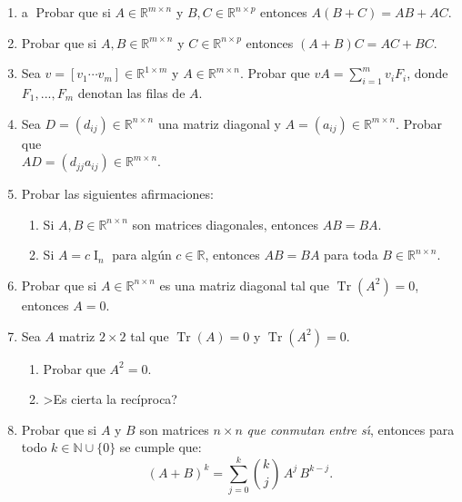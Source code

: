 \begin{enumerate}[resume, topsep=6pt, itemsep=.4cm]


\item\label{ej: distributiva} \textcircled{a} Probar que si $A\in\mathbb{R}^{m\times n}$ y $B,C\in\mathbb{R}^{n\times p}$ entonces
$A(B+ C)=AB + AC$.

\item Probar que si $A,B\in\mathbb{R}^{m\times n}$ y $C\in\mathbb{R}^{n\times p}$ entonces
$(A+B)C = AC + BC$.

\item Sea $v=[v_1 \cdots v_m]\in\mathbb{R}^{1\times m}$ y $A\in\mathbb{R}^{m\times n}$. Probar que $vA=\sum_{i=1}^m v_iF_i$, donde $F_1, ..., F_m$ denotan las filas de $A$.

\item Sea $D=(d_{ij})\in\mathbb{R}^{n\times n}$ una matriz diagonal y $A=(a_{ij})\in\mathbb{R}^{m\times n}$. Probar que \\ $AD=(d_{jj}a_{ij})\in\mathbb{R}^{m\times n}$.

\item
Probar las siguientes afirmaciones:
\begin{enumerate}[topsep=5pt,itemsep=5pt]
\item Si $A,B\in\mathbb{R}^{n\times n}$ son matrices diagonales, entonces $AB=BA$.
\item Si $A=c \operatorname{I}_n$ para algún $c \in \mathbb{R}$, entonces $AB=BA$ para toda $B\in\mathbb{R}^{n\times n}$.
\end{enumerate}

\item Probar que si $A\in\mathbb{R}^{n\times n}$ es una matriz diagonal tal que $\operatorname{Tr} (A^2)=0$, entonces $A=0$.

\item Sea $A$ matriz $2\times 2$  tal que $\operatorname{Tr}(A)=0$ y $\operatorname{Tr}(A^2)=0$.

\begin{enumerate}[topsep=5pt,itemsep=5pt]
    \item  Probar que $A^2 = 0$.
    \item   >Es cierta la recíproca?
\end{enumerate}


\item Probar que si $A$ y $B$ son matrices $n \times n$ \emph{que conmutan entre s\' \i}, entonces para todo $k \in \mathbb N \cup \{0\}$ se cumple que:
$$(A+B)^k = \sum_{j = 0}^k \binom{k}{j} \, A^j \, B^{k-j}.$$


\end{enumerate}
